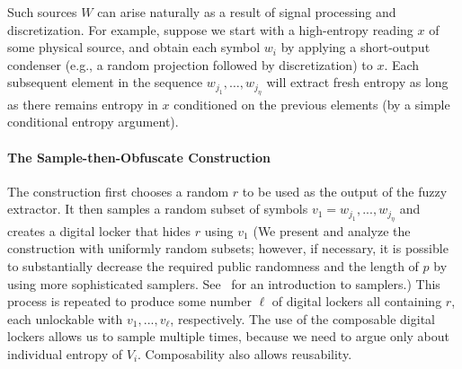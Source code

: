 \documentclass[11pt]{article}
\begin{document}
Such sources $W$ can arise naturally as a result of signal processing and discretization. For example, suppose we start with a high-entropy reading $x$ of some physical source, and obtain each symbol $w_i$ by applying a short-output condenser (e.g., a random projection followed by discretization) to $x$. 
Each subsequent element in the sequence $w_{j_1}, \dots, w_{j_\eta}$ will extract fresh entropy as long as there remains entropy in $x$ conditioned on the previous elements (by a simple conditional entropy argument).


\paragraph{The Sample-then-Obfuscate Construction}
The construction first chooses a random $r$ to be used as the output of the fuzzy extractor. It then samples a random subset of symbols $v_1=w_{j_1},..., w_{j_\eta}$ and creates a digital locker that hides $r$ using $v_1$ (We present and analyze the construction with uniformly random subsets; however, if necessary, it is possible to substantially decrease the required public randomness and the length of $p$ by using more sophisticated samplers. See~\cite{goldreich2011sample} for an introduction to samplers.) This process is repeated to produce some number $\ell$ of digital lockers all containing $r$,  each unlockable with $v_1,..., v_\ell$, respectively. The use of the composable digital lockers allows us to sample multiple times, because we need to argue only about individual entropy of $V_i$.  Composability also allows reusability.
\end{document}
